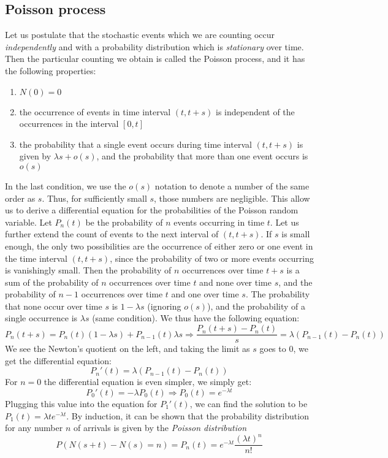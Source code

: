 \documentclass[11pt]{book}
\begin{document}
\subsection{Poisson process}
Let us postulate that the stochastic events which we are counting occur \emph{independently} and with a probability distribution which is \emph{stationary} over time.
Then the particular counting we obtain is called the Poisson process, and it has the following properties:
\begin{enumerate}
\item $N(0) = 0$
\item the occurrence of events in time interval $(t, t+s)$ is independent of the occurrences in the interval $[0,t]$
\item the probability that a single event occurs during time interval $(t, t+s)$ is given by $\lambda s + o(s)$, and the probability that more than one event occurs is $o(s)$
\end{enumerate}
In the last condition, we use the $o(s)$ notation to denote a number of the same order as $s$. Thus, for sufficiently small $s$, those numbers are negligible. This allow us to derive a differential equation for the probabilities of the Poisson random variable. Let $P_n(t)$ be the probability of $n$ events occurring in time $t$. Let us further extend the count of events to the next interval of $(t,t+s)$. If $s$ is small enough, the only two possibilities are the occurrence of either zero or one event in the time interval $(t,t+s)$, since the probability of two or more events occurring is vanishingly small. Then the probability of $n$ occurrences over time $t+s$ is a sum of the probability of $n$ occurrences over time $t$ and none over time $s$, and the probability of $n-1$ occurrences over time $t$ and one over time $s$. The probability that none occur over time $s$ is $1-\lambda s$ (ignoring $o(s)$), and the probability of a single occurrence is $\lambda s$ (same condition). We thus have the following equation:
$$ P_n(t+s) = P_n(t) (1- \lambda s) + P_{n-1}(t) \lambda s \Rightarrow  \frac{P_n(t+s) - P_n(t)}{s} = \lambda(P_{n-1}(t) - P_{n}(t))$$
We see the Newton's quotient on the left, and taking the limit as $s$ goes to 0, we get the differential equation:
$$ P_n'(t) = \lambda(P_{n-1}(t) - P_{n}(t))$$
For $n=0$ the differential equation is even simpler, we simply get:
$$ P_0'(t) = - \lambda P_0(t) \Rightarrow P_0(t) = e^{- \lambda t}$$
Plugging this value into the equation for $P_1'(t)$, we can find the solution to be $P_1(t) = \lambda t e^{- \lambda t}$. By induction, it can be shown that the probability distribution for any number $n$ of arrivals is given by the \emph{Poisson distribution}
$$ P(N(s+t) - N(s) = n) = P_n(t) = e^{- \lambda t} \frac{ (\lambda t)^n}{n!} $$
\end{document}
